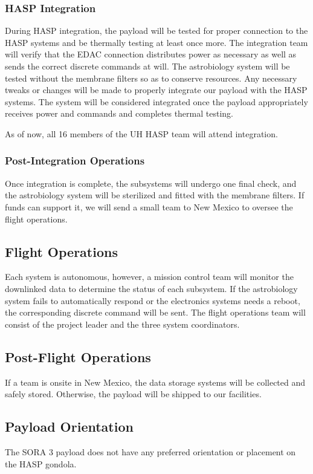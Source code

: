 \subsubsection{HASP Integration}
During HASP integration, the payload will be tested for proper connection to the HASP systems and be thermally testing at least once more.
The integration team will verify that the EDAC connection distributes power as necessary as well as sends the correct discrete commands at will.
The astrobiology system will be tested without the membrane filters so as to conserve resources.
Any necessary tweaks or changes will be made to properly integrate our payload with the HASP systems.
The system will be considered integrated once the payload appropriately receives power and commands and completes thermal testing.

As of now, all \num{16} members of the UH HASP team will attend integration. 

\subsubsection{Post-Integration Operations}
Once integration is complete, the subsystems will undergo one final check, and the astrobiology system will be sterilized and fitted with the membrane filters. If funds can support it, we will send a small team to New Mexico to oversee the flight operations.

\subsection{Flight Operations}
Each system is autonomous, however, a mission control team will monitor the downlinked data to determine the status of each subsystem. If the astrobiology system fails to automatically respond or the electronics systems needs a reboot, the corresponding discrete command will be sent.
The flight operations team will consist of the project leader and the three system coordinators.

\subsection{Post-Flight Operations}
If a team is onsite in New Mexico, the data storage systems will be collected and safely stored. Otherwise, the payload will be shipped to our facilities.

\subsection{Payload Orientation}
The SORA 3 payload does not have any preferred orientation or placement on the HASP gondola.